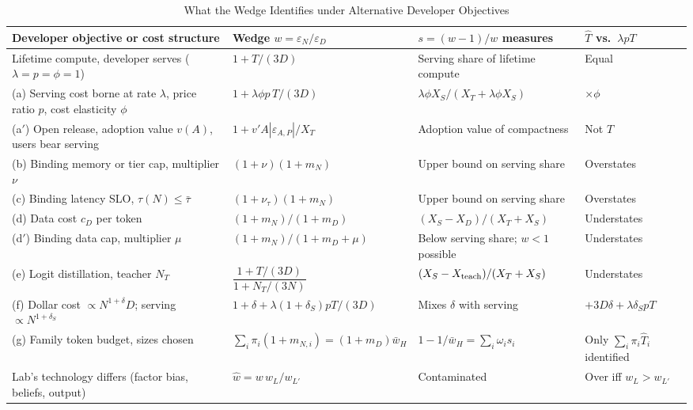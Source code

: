 \begin{table}[tp]
\centering
\caption{What the Wedge Identifies under Alternative Developer Objectives}
\label{tab:ra5-wedge-cases}
\scriptsize
\setlength{\tabcolsep}{3pt}
\begin{tabular}{@{}>{\raggedright\arraybackslash}p{} >{\raggedright\arraybackslash}p{} >{\raggedright\arraybackslash}p{} >{\raggedright\arraybackslash}p{}@{}}
\toprule
Developer objective or cost structure & Wedge $w=\varepsilon_N/\varepsilon_D$ & $s=(w-1)/w$ measures & $\hat T$ vs.\ $\lambda pT$ \\
\midrule
Lifetime compute, developer serves ($\lambda=p=\phi=1$) & $1+T/(3D)$ & Serving share of lifetime compute & Equal \\
(a) Serving cost borne at rate $\lambda$, price ratio $p$, cost elasticity $\phi$ & $1+\lambda\phi p\,T/(3D)$ & $\lambda\phi X_S/(X_T+\lambda\phi X_S)$ & $\times\phi$ \\
(a$'$) Open release, adoption value $v(A)$, users bear serving & $1+v'A|\varepsilon_{A,P}|/X_T$ & Adoption value of compactness & Not $T$ \\
(b) Binding memory or tier cap, multiplier $\nu$ & $(1+\nu)(1+m_N)$ & Upper bound on serving share & Overstates \\
(c) Binding latency SLO, $\tau(N)\le\bar\tau$ & $(1+\nu_\tau)(1+m_N)$ & Upper bound on serving share & Overstates \\
(d) Data cost $c_D$ per token & $(1+m_N)/(1+m_D)$ & $(X_S-X_D)/(X_T+X_S)$ & Understates \\
(d$'$) Binding data cap, multiplier $\mu$ & $(1+m_N)/(1+m_D+\mu)$ & Below serving share; $w<1$ possible & Understates \\
(e) Logit distillation, teacher $N_T$ & $\dfrac{1+T/(3D)}{1+N_T/(3N)}$ & $(X_S-X_{\rm teach})/(X_T+X_S)$ & Understates \\
(f) Dollar cost $\propto N^{1+\delta}D$; serving $\propto N^{1+\delta_S}$ & $1+\delta+\lambda(1+\delta_S)pT/(3D)$ & Mixes $\delta$ with serving & $+3D\delta+\lambda\delta_SpT$ \\
(g) Family token budget, sizes chosen & $\sum_i\pi_i(1+m_{N,i})=(1+m_D)\bar w_H$ & $1-1/\bar w_H=\sum_i\omega_is_i$ & Only $\sum_i\pi_i\hat T_i$ identified \\
Lab's technology differs (factor bias, beliefs, output) & $\hat w=w\,w_L/w_{L'}$ & Contaminated & Over iff $w_L>w_{L'}$ \\
\bottomrule
\end{tabular}

\end{table}
